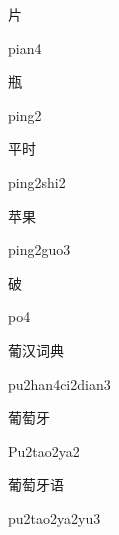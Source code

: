 \begin{verbete}[pian4]{片}
\begin{pronuncia}{pian4}
\end{pronuncia}
\end{verbete}

\begin{verbete}[ping2]{瓶}
\begin{pronuncia}{ping2}
\end{pronuncia}
\end{verbete}

\begin{verbete}{平时}
\begin{pronuncia}{ping2shi2}
\end{pronuncia}
\end{verbete}

\begin{verbete}{苹果}
\begin{pronuncia}{ping2guo3}
\end{pronuncia}
\end{verbete}

\begin{verbete}[po4]{破}
\begin{pronuncia}{po4}
\end{pronuncia}
\end{verbete}

\begin{verbete}{葡汉词典}
\begin{pronuncia}{pu2han4ci2dian3}
\end{pronuncia}
\end{verbete}

\begin{verbete}[Pu2tao2ya2]{葡萄牙}
\begin{pronuncia}{Pu2tao2ya2}
\end{pronuncia}
\end{verbete}

\begin{verbete}[pu2tao2ya2yu3]{葡萄牙语}
\begin{pronuncia}{pu2tao2ya2yu3}
\end{pronuncia}
\end{verbete}


